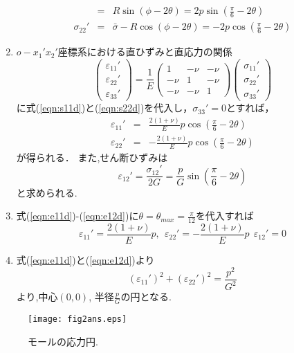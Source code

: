 \documentclass[10pt,a4j]{jarticle}
\begin{document}
\begin{enumerate}
\begin{eqnarray}
		&=& R \sin \left( \phi- 2\theta \right)
		= 2p \sin \left( \frac{\pi}{6}-2\theta\right) 
		\label{eqn:s12d}
		\\
		\sigma_{22}'
		&=&\bar \sigma -R \cos \left( \phi- 2\theta \right)
		= -2p \cos \left( \frac{\pi}{6}-2\theta\right) 
		\label{eqn:s22d}
	\end{eqnarray}
\item
	$o-x_1'x_2'$座標系における直ひずみと直応力の関係
	\begin{equation}
		\left(
		\begin{array}{c}
			\varepsilon_{11}' \\
			\varepsilon_{22}' \\
			\varepsilon_{33}'
		\end{array}
		\right)
		=
		\frac{1}{E}
		\left(
		\begin{array}{ccc}
			1 & -\nu & -\nu \\
			-\nu & 1 & -\nu \\
			-\nu & -\nu & 1 
		\end{array}
		\right)
		\left(
		\begin{array}{c}
			\sigma_{11}' \\
			\sigma_{22}' \\
			\sigma_{33}'
		\end{array}
		\right)
		\label{eqn:Hooke_d}
	\end{equation}
	に式(\ref{eqn:s11d})と(\ref{eqn:s22d})を代入し，$\sigma_{33}'=0$とすれば，
	\begin{eqnarray}
		\varepsilon_{11}'&=&\frac{2(1+\nu)}{E}p\cos\left(\frac{\pi}{6}-2\theta\right) 
		\label{eqn:e11d}
		\\ 
		\varepsilon_{22}'&=&-\frac{2(1+\nu)}{E}p\cos\left(\frac{\pi}{6}-2\theta\right) 
		\label{eqn:e22d}
	\end{eqnarray}
	が得られる．
	また,せん断ひずみは
	\begin{equation}
		\varepsilon_{12}'=\frac{\sigma_{12}'}{2G}=\frac{p}{G}\sin\left(\frac{\pi}{6}-2\theta \right)
		\label{eqn:e12d}
	\end{equation}
	と求められる.
\item
	式(\ref{eqn:e11d})-(\ref{eqn:e12d})に$\theta=\theta_{max}=\frac{\pi}{12}$を代入すれば
	\[
		\varepsilon_{11}'=\frac{2(1+\nu)}{E} p,
		\ \ 
		\varepsilon_{22}'=-\frac{2(1+\nu)}{E} p
		\ \ 
		\varepsilon_{12}'=0
	\]
\item
	式(\ref{eqn:e11d})と(\ref{eqn:e12d})より
	\[
		(\varepsilon_{11}')^2 + (\varepsilon_{22}')^2  = \frac{p^2}{G^2}
	\]
	より,中心$(0,0)$, 半径$\frac{p}{G}$の円となる.
\end{enumerate}
\begin{figure}
	\begin{center}
	\texttt{[image: fig2ans.eps]} 
	\end{center}
	\caption{モールの応力円.} 
	\label{fig:fig2}
\end{figure}
\end{document}
